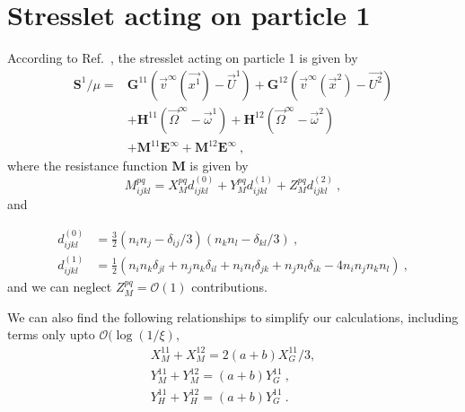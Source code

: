 \documentclass[reprint, amsmath,amssymb,aps,pre,onecolumn,notitlepage%
]{revtex4-1}
\begin{document}
\section{Stresslet acting on particle 1}
According to Ref.~\cite{KK1991}, the stresslet acting on particle 1 is given by
\begin{equation}
	\begin{split}
		\bm{S}^1/\mu=& \bm{G}^{11}(\vec{v}^\infty(\vec{x^1})-\vec{U}^1)+\bm{G}^{12}(\vec{v}^\infty(\vec{x}^2)-\vec{U^2})\\
		&+ \bm{H}^{11}(\vec{\Omega}^\infty-\vec{\omega}^1)+\bm{H}^{12}(\vec{\Omega}^\infty-\vec{\omega}^2)\\
		&+ \bm{M}^{11}\bm{E}^\infty + \bm{M}^{12}\bm{E}^\infty \ ,
	\end{split}
	\label{eq:stresslet1}
\end{equation}
where the resistance function $\bm{M}$ is given by 
\begin{equation}
		M^{pq}_{ijkl}=X_M^{pq}d^{(0)}_{ijkl}+Y_M^{pq}d^{(1)}_{ijkl} +Z_M^{pq}d^{(2)}_{ijkl} \ ,
\end{equation}
and 

\begin{equation}
	\begin{split}
		d^{(0)}_{ijkl}&=\frac{3}{2}(n_in_j-\delta_{ij}/3)(n_kn_l-\delta_{kl}/3)\ ,\\
		d^{(1)}_{ijkl}&=\frac{1}{2}(n_in_k\delta_{jl}+n_jn_k\delta_{il}+n_in_l\delta_{jk}+n_jn_l\delta_{ik}-4 n_i n_j n_k n_l)\ ,
	\end{split}
\end{equation}
and we can neglect $Z_M^{pq}=\mathcal{O}(1)$ contributions.

We can also find the following relationships to simplify our calculations, including terms only upto $\mathcal{O}(\log{(1/\xi)}$,
\begin{equation}
	\begin{split}
		X_M^{11}+X_M^{12}=2(a+b)X_G^{11}/3,\\
		Y_M^{11}+Y_M^{12}=(a+b)Y_G^{11}\ , \\
		Y_H^{11}+Y_H^{12}=(a+b)Y_G^{11}\ . 
	\end{split}
\end{equation}
\end{document}
